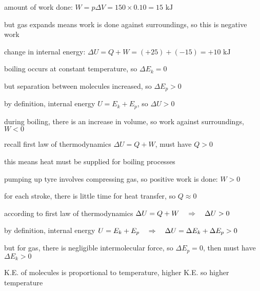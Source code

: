 
\begin{soln} amount of work done: $W = p \Delta V = 150 \times 0.10 = 15 \text{ kJ}$

but gas expands means work is done against surroundings, so this is negative work

change in internal energy: $\Delta U = Q +  W = (+25) + (-15) = +10 \text{ kJ}$ \end{soln}


\begin{soln} boiling occurs at constant temperature, so $\Delta E_k = 0$

but separation between molecules increased, so $\Delta E_p >0$

by definition, internal energy $U=E_k+E_p$, so $\Delta U >0$

during boiling, there is an increase in volume, so work against surroundings, $W<0$

recall first law of thermodynamics $\Delta U = Q + W$, must have $Q>0$

this means heat must be supplied for boiling processes \end{soln}


\begin{soln} pumping up tyre involves compressing gas, so positive work is done: $W>0$

for each stroke, there is little time for heat transfer, so $Q \approx 0$

according to first law of thermodynamics $\Delta U = Q + W \quad \Rightarrow \quad \Delta U >0$

by definition, internal energy $U=E_k + E_p \quad \Rightarrow \quad \Delta U = \Delta E_k + \Delta E_p>0$

but for gas, there is negligible intermolecular force, so $\Delta E_p=0$, then must have $\Delta E_k>0$

K.E. of molecules is proportional to temperature, higher K.E. so higher temperature \end{soln}

